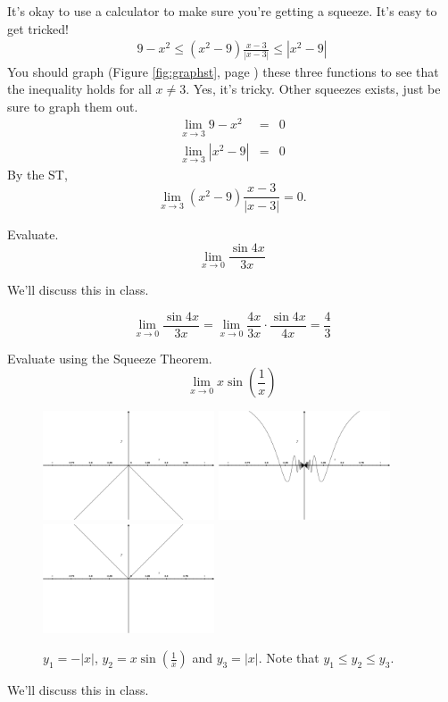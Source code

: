 \documentclass[12pt,addpoints, answers, fleqn]{exam}
\begin{document}
\begin{questions}
\begin{solution}
It's okay to use a calculator to make sure you're getting a squeeze. It's easy to get tricked!
\begin{eqnarray*}
9-x^2 \leq \left(x^2-9\right) \frac{x-3}{\left| x-3\right|} \leq \left| x^2-9\right|
\end{eqnarray*}
You should graph (Figure \ref{fig:graphst}, page \pageref{fig:graphst}) these three functions to see that the inequality holds for all $x \neq 3$. Yes, it's tricky. Other squeezes exists, just be sure to graph them out.
\begin{eqnarray*}
\lim_{x \to 3} 9-x^2 &=& 0\\ 
\lim_{x \to 3} \left| x^2-9\right| &=& 0
\end{eqnarray*}
By the ST,
\[
\lim_{x \to 3} \left(x^2-9\right) \frac{x-3}{\left| x-3\right|} = 0.
\]
\end{solution}
\question Evaluate.
\[
\mathop {\lim }\limits_{x \to 0}  \frac{\sin 4x}{ 3 x}
\]

\begin{solution}
We'll discuss this in class.

\[
\lim_{x \to 0}  \frac{\sin 4x}{ 3 x} = \lim_{x \to 0}  \frac{4x}{3x} \cdot \frac{\sin 4x}{ 4 x} = \frac{4}{3}
\]
\end{solution}

\question Evaluate using the Squeeze Theorem.
\[
\mathop {\lim }\limits_{x \to 0}  x \sin \left( \frac{1}{x} \right)
\]
\begin{figure}[htbp] %
   \centering
   \includegraphics[width=2in]{./graphics/graphst2030201.pdf}
   \includegraphics[width=2in]{./graphics/graphst20302.pdf}
   \includegraphics[width=2in]{./graphics/graphst20303.pdf}
  \caption{$y_1 = - \left| x \right|$,  $y_2 =  \displaystyle x \sin \left( \frac{1}{x} \right)$ and $y_3= \left| x \right|$. Note that $y_1 \leq y_2  \leq y_3$.}
   \label{fig:graphst02}
\end{figure}
\begin{solution}
We'll discuss this in class.


\end{solution}
\end{questions}
\end{document}
